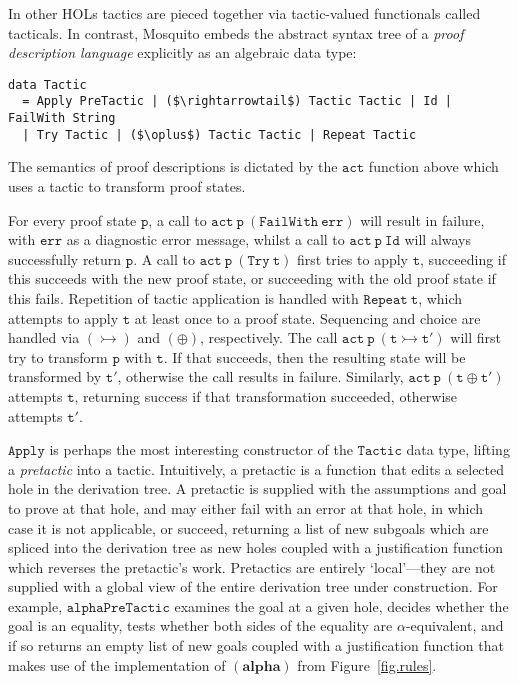\documentclass{llncs}
\newcommand{\mosquito}{Mosquito\xspace}
\newcommand{\rulefont}[1]{\ensuremath{(\mathbf{#1})}}
\begin{document}
In other HOLs tactics are pieced together via tactic-valued functionals called tacticals.
In contrast, \mosquito embeds the abstract syntax tree of a \emph{proof description language} explicitly as an algebraic data type:
\begin{lstlisting}
data Tactic
  = Apply PreTactic | ($\rightarrowtail$) Tactic Tactic | Id | FailWith String
  | Try Tactic | ($\oplus$) Tactic Tactic | Repeat Tactic
\end{lstlisting}

The semantics of proof descriptions is dictated by the $\mathtt{act}$ function above which uses a tactic to transform proof states.

For every proof state $\mathtt{p}$, a call to $\mathtt{act\ p\ (FailWith\ err)}$ will result in failure, with $\mathtt{err}$ as a diagnostic error message, whilst a call to $\mathtt{act\ p\ Id}$ will always successfully return $\mathtt{p}$.
A call to $\mathtt{act\ p\ (Try\ t)}$ first tries to apply $\mathtt{t}$, succeeding if this succeeds with the new proof state, or succeeding with the old proof state if this fails.
Repetition of tactic application is handled with $\mathtt{Repeat\ t}$, which attempts to apply $\mathtt{t}$ at least once to a proof state.
Sequencing and choice are handled via $(\rightarrowtail)$ and $(\oplus)$, respectively.
The call $\mathtt{act\ p\ (t \rightarrowtail t')}$ will first try to transform $\mathtt{p}$ with $\mathtt{t}$.
If that succeeds, then the resulting state will be transformed by $\mathtt{t'}$, otherwise the call results in failure.
Similarly, $\mathtt{act\ p\ (t \oplus t')}$ attempts $\mathtt{t}$, returning success if that transformation succeeded, otherwise attempts $\mathtt{t'}$.

$\mathtt{Apply}$ is perhaps the most interesting constructor of the $\mathtt{Tactic}$ data type, lifting a \emph{pretactic} into a tactic.
Intuitively, a pretactic is a function that edits a selected hole in the derivation tree.
A pretactic is supplied with the assumptions and goal to prove at that hole, and may either fail with an error at that hole, in which case it is not applicable, or succeed, returning a list of new subgoals which are spliced into the derivation tree as new holes coupled with a justification function which reverses the pretactic's work.
Pretactics are entirely `local'---they are not supplied with a global view of the entire derivation tree under construction.
For example, $\mathtt{alphaPreTactic}$ examines the goal at a given hole, decides whether the goal is an equality, tests whether both sides of the equality are $\alpha$-equivalent, and if so returns an empty list of new goals coupled with a justification function that makes use of the implementation of \rulefont{alpha} from Figure~\ref{fig.rules}.
\end{document}
